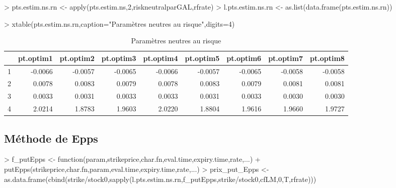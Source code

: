 \documentclass[letter]{report}
\begin{document}
\begin{Schunk}
\begin{Sinput}
> pts.estim.ns.rn <- apply(pts.estim.ns,2,riskneutralparGAL,rfrate)
> l.pts.estim.ns.rn <- as.list(data.frame(pts.estim.ns.rn))
\end{Sinput}
\end{Schunk}

\begin{Schunk}
\begin{Sinput}
> xtable(pts.estim.ns.rn,caption="Paramètres neutres au risque",digits=4)
\end{Sinput}
% latex table generated in R 3.1.0 by xtable 1.7-3 package
% Tue May 27 23:05:26 2014
\begin{table}[ht]
\centering
\begin{tabular}{rrrrrrrrr}
  \hline
 & pt.optim1 & pt.optim2 & pt.optim3 & pt.optim4 & pt.optim5 & pt.optim6 & pt.optim7 & pt.optim8 \\ 
  \hline
1 & -0.0066 & -0.0057 & -0.0065 & -0.0066 & -0.0057 & -0.0065 & -0.0058 & -0.0058 \\ 
  2 & 0.0078 & 0.0083 & 0.0079 & 0.0078 & 0.0083 & 0.0079 & 0.0081 & 0.0081 \\ 
  3 & 0.0033 & 0.0031 & 0.0033 & 0.0033 & 0.0031 & 0.0033 & 0.0030 & 0.0030 \\ 
  4 & 2.0214 & 1.8783 & 1.9603 & 2.0220 & 1.8804 & 1.9616 & 1.9660 & 1.9727 \\ 
   \hline
\end{tabular}
\caption{Paramètres neutres au risque} 
\end{table}\end{Schunk}


\subsection{Méthode de Epps}

\begin{Schunk}
\begin{Sinput}
> 	f_putEpps <- function(param,strikeprice,char.fn,eval.time,expiry.time,rate,...)
+ 		putEpps(strikeprice,char.fn,param,eval.time,expiry.time,rate,...)
> 	prix_put_Epps <- as.data.frame(cbind(strike/stock0,sapply(l.pts.estim.ns.rn,f_putEpps,strike/stock0,cfLM,0,T,rfrate)))
\end{Sinput}
\end{Schunk}
\end{document}
